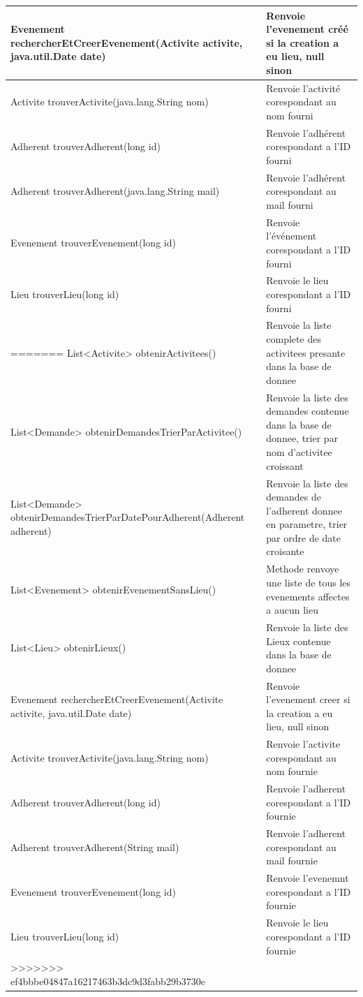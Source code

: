 \documentclass[a4paper,11pt]{article}
\begin{document}
\begin{table}[H]
\begin{center}
\begin{longtable}{|P{7cm}|p{7cm}|}
       Evenement rechercherEtCreerEvenement(Activite activite, java.util.Date date) & Renvoie l'evenement créé si la creation a eu lieu, null sinon  \\ \hline
       Activite trouverActivite(java.lang.String nom) & Renvoie l'activité corespondant au nom fourni  \\ \hline
       Adherent trouverAdherent(long id) & Renvoie l'adhérent corespondant a l'ID fourni  \\ \hline
       Adherent trouverAdherent(java.lang.String mail) & Renvoie l'adhérent corespondant au mail fourni  \\ \hline
       Evenement trouverEvenement(long id) & Renvoie l'événement corespondant a l'ID fourni  \\ \hline
       Lieu trouverLieu(long id) & Renvoie le lieu corespondant a l'ID fourni \\ \hline
=======
       List<Activite> obtenirActivitees() & Renvoie la liste complete des activitees presante dans la base de donnee  \\ \hline
       List<Demande> obtenirDemandesTrierParActivitee() & Renvoie la liste des demandes contenue dans la base de donnee, trier par nom d'activitee croissant  \\ \hline
       List<Demande> obtenirDemandesTrierParDatePourAdherent(Adherent adherent) & Renvoie la liste des demandes de l'adherent donnee en parametre, trier par ordre de date croisante  \\ \hline
       List<Evenement> obtenirEvenementSansLieu() & Methode renvoye une liste de tous les evenements affectes a aucun lieu  \\ \hline
       List<Lieu> obtenirLieux() & Renvoie la liste des Lieux contenue dans la base de donnee  \\ \hline
       Evenement rechercherEtCreerEvenement(Activite activite, java.util.Date date) & Renvoie l'evenement creer si la creation a eu lieu, null sinon  \\ \hline
       Activite trouverActivite(java.lang.String nom) & Renvoie l'activite corespondant au nom fournie  \\ \hline
       Adherent trouverAdherent(long id) & Renvoie l'adherent corespondant a l'ID fournie  \\ \hline
       Adherent trouverAdherent(String mail) & Renvoie l'adherent corespondant au mail fournie  \\ \hline
       Evenement trouverEvenement(long id) & Renvoie l'evenemnt corespondant a l'ID fournie  \\ \hline
       Lieu trouverLieu(long id) & Renvoie le lieu corespondant a l'ID fournie \\ \hline
>>>>>>> ef4bbbe04847a16217463b3dc9d3fabb29b3730e
    \end{longtable}
  \end{center}
\end{table}
\end{document}
